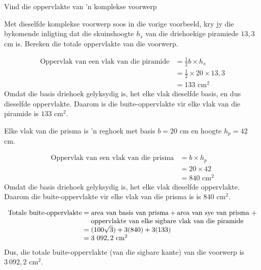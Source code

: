 \begin{wex}{Vind die oppervlakte van 'n komplekse voorwerp}
{
\begin{minipage}{0.9\textwidth}
Met dieselfde komplekse voorwerp soos in die vorige voorbeeld, kry jy
  die bykomende inligting dat die skuinshoogte $ h_s $ van die
  driehoekige piramiede $ 13,3 $ cm is. Bereken die totale oppervlakte
  van die voorwerp.
\end{minipage}
}
{
\begin{align*}
  \mbox{Oppervlak van een vlak van die piramide}

  &= \frac{1}{2}b \times h_s \\
  &= \frac{1}{2} \times 20 \times 13,3 \\
  &= 133\mbox{ cm}^2
\end{align*}
Omdat die basis driehoek gelyksydig is, het elke vlak dieselfde basis,
en dus dieselfde oppervlakte. Daarom is die buite-oppervlakte vir
elke vlak van die piramide is $133$ cm$^{2}$.

Elke vlak van die prisma is 'n reghoek met basis $b = 20$ cm en hoogte $h_p = 42$ cm.


\begin{align*}
  \mbox{Oppervlak van een vlak van die prisma}
  &= b \times h_p \\
  &= 20 \times 42 \\
  &= 840\mbox{ cm}^2
\end{align*}
Omdat die basis driehoek gelyksydig is, het elke vlak dieselfde oppervlakte. Daarom die buite-oppervlakte vir
elke vlak van die prisma is
is $840$ cm$^{2}$.

\begin{equation*}
  \begin{array}{r@{\;}c@{\;}l}
    \mbox{Totale buite-oppervlakte} &=& \mbox{area van basis van prisma} + \mbox{area van sye van prisma } + \\
                              & & \mbox{oppervlakte van elke sigbare vlak van die piramide} \\
    &=& (100 \sqrt{3}) + 3(840) + 3(133) \\
    &=& 3~092,2\mbox{ cm}^2
  \end{array}
\end{equation*}
Dus, die totale buite-oppervlakte (van die sigbare kante) van die voorwerp is $3~092,2$ cm$^{2}$.
}
\end{wex}


